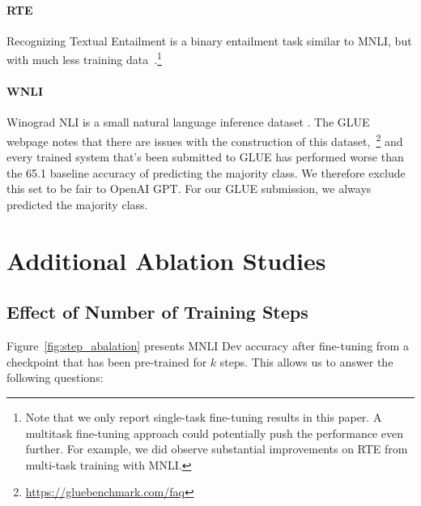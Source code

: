 \documentclass[11pt,a4paper]{article}
\begin{document}
\paragraph{RTE} Recognizing Textual Entailment is a binary entailment task similar to MNLI, but with much less training data~\cite{bentivogli-etal:2009}.\footnote{Note that we only report single-task fine-tuning results in this paper. A multitask fine-tuning approach could potentially push
the performance even further. For example, we did observe substantial improvements on RTE from multi-task training with MNLI.}

\paragraph{WNLI} Winograd NLI is a small natural language inference dataset \cite{levesque-davis-morgenstern:2011:_winog}. The GLUE webpage notes that there are issues with the construction of this dataset,~\footnote{\url{https://gluebenchmark.com/faq}} and every trained system that's been submitted to GLUE has performed worse than the 65.1 baseline accuracy of predicting the majority class. We therefore exclude this set to be fair to OpenAI GPT. For our GLUE submission, we always predicted the majority class.

\section{Additional Ablation Studies}
\label{appendix:sec:more_ablation_studies}

\subsection{Effect of Number of Training Steps}
\label{sec:num_training_steps}

Figure~\ref{fig:step_abalation} presents MNLI Dev accuracy after fine-tuning from a checkpoint that has been pre-trained for $k$ steps. This allows us to answer the following questions:
\end{document}
